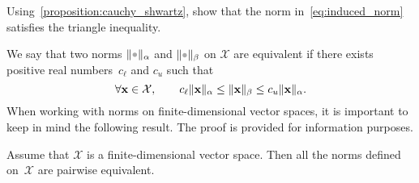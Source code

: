 \begin{exercise}
    Using~\cref{proposition:cauchy_shwartz},
    show that the norm in~\eqref{eq:induced_norm} satisfies the triangle inequality.
\end{exercise}

We say that two norms $\norm{\placeholder}_{\alpha}$ and $\norm{\placeholder}_{\beta}$ on $\mathcal X$ are equivalent if
there exists positive real numbers~$c_{\ell}$ and $c_u$ such that
\begin{equation}
    \label{eq:norm_equilavence}
    \forall \mathbf x \in \mathcal X,
    \qquad c_{\ell} \lVert\mathbf x\rVert_{\alpha}
    \leq \lVert\mathbf x\rVert_{\beta}
    \leq c_u \lVert\mathbf x\rVert_{\alpha}.
\end{equation}
When working with norms on finite-dimensional vector spaces,
it is important to keep in mind the following result.
The proof is provided for information purposes.
\begin{proposition}
    Assume that $\mathcal X$ is a finite-dimensional vector space.
    Then all the norms defined on~$\mathcal X$ are pairwise equivalent.
\end{proposition}
